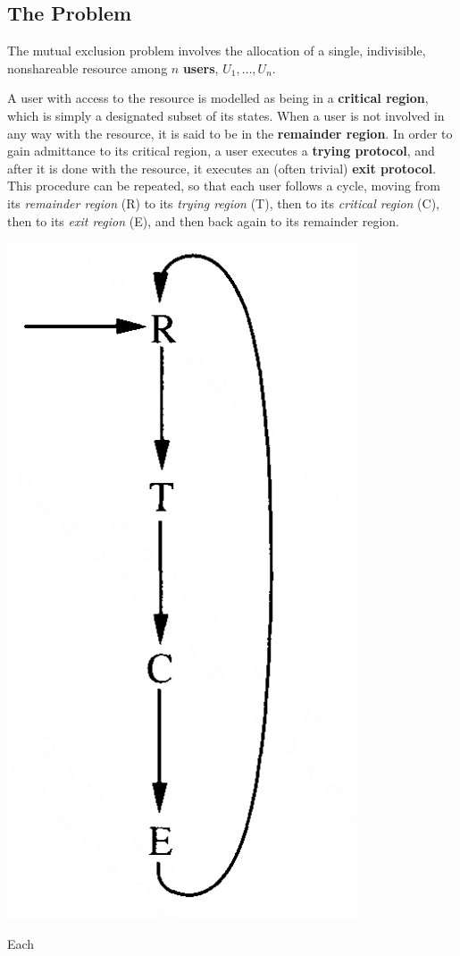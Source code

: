 \documentclass[11pt]{article}
\begin{document}
\subsection{The Problem}
\label{sec:org90fefda}
The mutual exclusion problem involves the allocation of a single, indivisible, nonshareable resource
among \(n\) \textbf{users}, \(U_1,\dots,U_n\).

A user with access to the resource is modelled as being in a \textbf{critical region}, which is simply a
designated subset of its states. When a user is not involved in any way with the resource, it is said
to be in the \textbf{remainder region}. In order to gain admittance to its critical region, a user executes a
\textbf{trying protocol}, and after it is done with the resource, it executes an (often trivial) \textbf{exit protocol}.
This procedure can be repeated, so that each user follows a cycle, moving from its
\emph{remainder region} (R) to its \emph{trying region} (T), then to its \emph{critical region} (C), then to its \emph{exit
region} (E), and then back again to its remainder region.  

\begin{center}
\includegraphics[width=.2\textwidth]{../images/DistributedAlgorithms/1.png}
\end{center}

Each 
\end{document}
